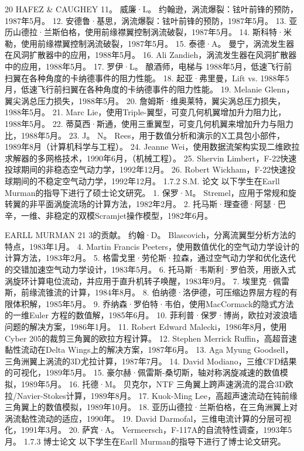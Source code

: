 \documentclass[UTF8,11pt,a4paper,openany,fontset=fandol]{ctexbook}
\begin{document}
20 HAFEZ \& CAUGHEY 11。 威廉·L。 约翰逊，涡流爆裂：铉叶前锋的预防，1987年5月。 12. 安德鲁·基思，涡流爆裂：铉叶前锋的预防，1987年5月。 13. 亚历山德拉·兰斯伯格，使用前缘襟翼控制涡流破裂，1987年5月。 14. 斯科特·米勒，使用前缘襟翼控制涡流破裂，1987年5月。 15. 泰德·A。 曼宁，涡流发生器在风洞扩散器中的应用，1988年5月。 16. Ali Zandieh，涡流发生器在风洞扩散器中的应用，1988年5月。 17. 罗伊·L。 酿酒师，电梯与 1988年5月，低速飞行前扫翼在各种角度的卡纳德事件的阻力性能。 18. 起亚·弗里曼，Lift vs. 1988年5月，低速飞行前扫翼在各种角度的卡纳德事件的阻力性能。 19. Melanie Glenn，翼尖涡总压力损失，1988年5月。 20. 詹姆斯·维奥莱特，翼尖涡总压力损失，1988年5月。 21. Marc Lie，使用Triple-翼型，可变几何机翼增加升力阻力比，1988年5月。 22. 蒂莫西·斯通，使用三重翼型，可变几何机翼来增加升力与阻力比，1988年5月。 23. J。 N。 Rees，用于数值分析和演示的X工具包小部件，1989年8月（计算机科学与工程）。 24. Jeanne Wei，使用数据流架构实现二维欧拉求解器的多网格技术，1990年6月，（机械工程）。 25. Shervin Limbert，F-22快速投球期间的非稳态空气动力学，1992年12月。 26. Robert Wickham，F-22快速投球期间的不稳定空气动力学，1992年12月。 1.7.2 S.M. 论文 以下学生在Earll Murman的指导下进行了硕士论文研究。 1. 保罗·M。 Stremel，应用于常规和旋转翼的非平面涡旋流场的计算方法，1982年2月。 2. 托马斯·理查德·阿瑟·巴辛，一维、非稳定的双模Scramjet操作模型，1982年6月。

EARLL MURMAN 21 3的贡献。 约翰·D。 Blascovich，分离流翼型分析方法的特点，1983年1月。 4. Martin Francis Peeters，使用数值优化的空气动力学设计的计算方法，1983年2月。 5. 格雷戈里·劳伦斯·拉森，通过空气动力学和优化迭代的交错加速空气动力学设计，1983年5月。 6. 托马斯·韦斯利·罗伯茨，用嵌入式涡旋环计算电位流动，并应用于直升机转子唤醒，1983年9月。 7. 埃里克·佩雷斯，前缘流锥流的计算，1984年8月。 8. 伯纳德·洛伊德，可压缩边界层方程的有限体积解，1985年5月。 9. 乔纳森·罗伯特·韦伯，使用MacCormack的隐式方法的一维Euler 方程的数值解，1985年6月。 10. 菲利普·保罗·博尚，欧拉对波浪墙问题的解决方案，1986年1月。 11. Robert Edward Malecki，1986年8月，使用Cyber 205的裁剪三角翼的欧拉方程计算。 12. Stephen Merrick Ruffin，高超音速黏性流动在Delta Wings上的解决方案，1987年6月。 13. Aga Myung Goodsell，三角洲翼上涡流的3D尤拉计算，1987年7月。 14. David Modiano，三维CFD结果的可视化，1989年5月。 15. 豪尔赫·佩雷斯-桑切斯，轴对称涡旋减速的数值模拟，1989年5月。 16. 托德·M。 贝克尔，NTF 三角翼上跨声速涡流的混合3D欧拉/Navier-Stokes计算，1989年8月。 17. Kuok-Ming Lee，高超声速流动在钝前缘三角翼上的数值模拟，1989年10月。 18. 亚历山德拉·兰斯伯格，在三角洲翼上对涡流黏性流动的适应，1990年。 19. David Darmofal，三维电流计算的分层可视化，1991年3月。 20. 萨宾·A。 Vermeersch，F-117A的自流特性调查，1993年5月。 1.7.3 博士论文 以下学生在Earll Murman的指导下进行了博士论文研究。
\end{document}
